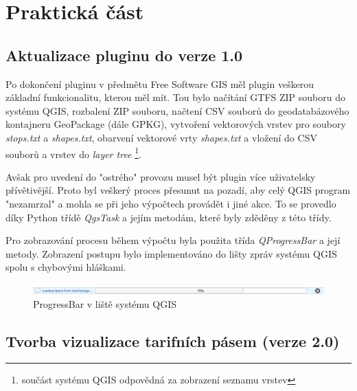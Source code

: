 \chapter{Praktická část}
\label{5-postup}

\section{Aktualizace pluginu do verze 1.0}
Po dokončení pluginu v předmětu Free Software GIS měl plugin veškerou základní
funkcionalitu, kterou měl mít. Tou bylo načítání GTFS ZIP souboru do systému QGIS,
rozbalení ZIP souboru, načtení CSV souborů do geodatabázového kontajneru GeoPackage (dále GPKG),
vytvoření vektorových vrstev pro soubory \textit{stops.txt} a \textit{shapes.txt},
obarvení vektorové vrty \textit{shapes.txt} a vložení do CSV souborů a vrstev do
\textit{layer tree} \footnote{součást systému QGIS odpovědná za zobrazení seznamu vrstev}.


Avšak pro uvedení do "ostrého" provozu musel být plugin více uživatelsky přívětivější.
Proto byl veškerý proces přesunut na pozadí, aby celý QGIS program "nezamrzal" a
mohla se při jeho výpočtech provádět i jiné akce. To se provedlo díky Python třídě \textit{QgsTask}
a jejím metodám, které byly zděděny z této třídy. \cite{QgsTask}

Pro zobrazování procesu během výpočtu byla použita třída \textit{QProgressBar} a její metody.
Zobrazení postupu bylo implementováno do lišty zpráv systému QGIS spolu s chybovými hláškami.

\begin{figure}[H] \centering
    \includegraphics[width=400pt]{./pictures/loading.png}
    \caption[ProgressBar]{ProgressBar v liště systému QGIS}
	\label{fig:ProgressBar v liště systému QGIS}              
\end{figure}     


\section{Tvorba vizualizace tarifních pásem (verze 2.0)}


